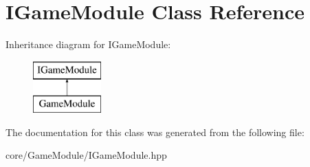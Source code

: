 \hypertarget{class_i_game_module}{}\section{I\+Game\+Module Class Reference}
\label{class_i_game_module}
Inheritance diagram for I\+Game\+Module\+:\begin{figure}[H]
\begin{center}
\leavevmode
\includegraphics[height=2.000000cm]{class_i_game_module}
\end{center}
\end{figure}


The documentation for this class was generated from the following file\+:\begin{DoxyCompactItemize}
\item 
core/\+Game\+Module/I\+Game\+Module.\+hpp\end{DoxyCompactItemize}
